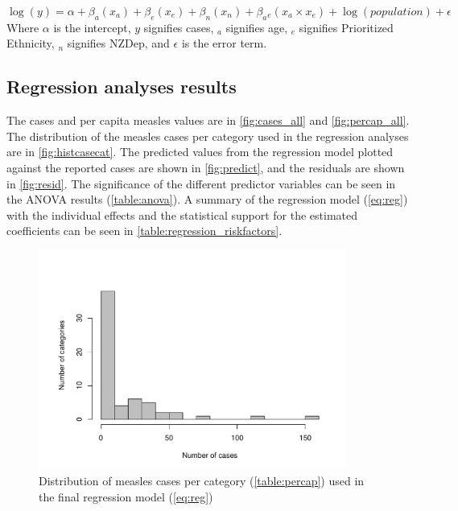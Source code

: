 \documentclass{article}
\begin{document}
\begin{equation} \label{eq:reg}
 \log(y) = \alpha + \beta _a (x_a)+ \beta _e(x_e)+ \beta _n (x_n) + \beta _a{}_e(x_a \times x_e)+ \log(population)  + \epsilon
  \end{equation}
Where $\alpha$ is the intercept, $y$ signifies cases, $_a$ signifies age, $_e$ signifies Prioritized Ethnicity, $_n$ signifies NZDep, and $\epsilon$ is the error term.

\subsection{Regression analyses results}
\label{sub:regression_results}

The cases and per capita measles values are in \autoref{fig:cases_all} and \autoref{fig:percap_all}. The distribution of the measles cases per category used in the regression analyses are in \autoref{fig:histcasecat}. The predicted values from the regression model plotted against the reported cases are shown in \autoref{fig:predict}, and the residuals are shown in \autoref{fig:resid}. The significance of the different predictor variables can be seen in the ANOVA results (\autoref{table:anova}). A summary of the regression model (\autoref{eq:reg}) with the individual effects and the statistical support for the estimated coefficients can be seen in \autoref{table:regression_riskfactors}.

\begin{figure}
\begin{center}
     \includegraphics[width=0.9\textwidth]{Cases_regmodel.pdf}
\end{center}
\caption{Distribution of measles cases per category (\autoref{table:percap}) used in the final regression model (\autoref{eq:reg})}
\label{fig:histcasecat}
\end{figure}
\end{document}
